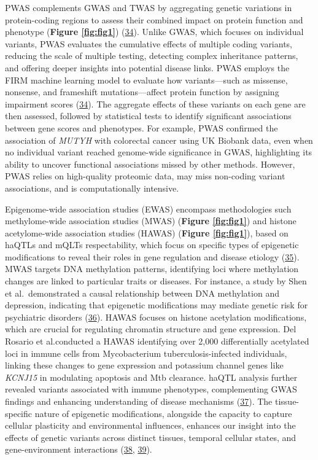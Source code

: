 PWAS complements GWAS and TWAS by aggregating genetic variations in protein-coding regions to assess their combined impact on protein function and phenotype (\textbf{Figure \ref{fig:fig1}}) (\protect\hyperlink{ref-1Dsj6bEd3}{34}).
Unlike GWAS, which focuses on individual variants, PWAS evaluates the cumulative effects of multiple coding variants, reducing the scale of multiple testing, detecting complex inheritance patterns, and offering deeper insights into potential disease links.
PWAS employs the FIRM machine learning model to evaluate how variants---such as missense, nonsense, and frameshift mutations---affect protein function by assigning impairment scores (\protect\hyperlink{ref-1Dsj6bEd3}{34}).
The aggregate effects of these variants on each gene are then assessed, followed by statistical tests to identify significant associations between gene scores and phenotypes.
For example, PWAS confirmed the association of \emph{MUTYH} with colorectal cancer using UK Biobank data, even when no individual variant reached genome-wide significance in GWAS, highlighting its ability to uncover functional associations missed by other methods.
However, PWAS relies on high-quality proteomic data, may miss non-coding variant associations, and is computationally intensive.

Epigenome-wide association studies (EWAS) encompass methodologies such methylome-wide association studies (MWAS) (\textbf{Figure \ref{fig:fig1}}) and histone acetylome-wide association studies (HAWAS) (\textbf{Figure \ref{fig:fig1}}), based on haQTLs and mQLTs respectability, which focus on specific types of epigenetic modifications to reveal their roles in gene regulation and disease etiology (\protect\hyperlink{ref-TPqvAJda}{35}).
MWAS targets DNA methylation patterns, identifying loci where methylation changes are linked to particular traits or diseases.
For instance, a study by Shen et al.~demonstrated a causal relationship between DNA methylation and depression, indicating that epigenetic modifications may mediate genetic risk for psychiatric disorders (\protect\hyperlink{ref-1DNxNkLsT}{36}).
HAWAS focuses on histone acetylation modifications, which are crucial for regulating chromatin structure and gene expression.
Del Rosario et al.conducted a HAWAS identifying over 2,000 differentially acetylated loci in immune cells from Mycobacterium tuberculosis-infected individuals, linking these changes to gene expression and potassium channel genes like \emph{KCNJ15} in modulating apoptosis and Mtb clearance.
haQTL analysis further revealed variants associated with immune phenotypes, complementing GWAS findings and enhancing understanding of disease mechanisms (\protect\hyperlink{ref-1BYHeZlgB}{37}).
The tissue-specific nature of epigenetic modifications, alongside the capacity to capture cellular plasticity and environmental influences, enhances our insight into the effects of genetic variants across distinct tissues, temporal cellular states, and gene-environment interactions (\protect\hyperlink{ref-FeaSnwhX}{38}, \protect\hyperlink{ref-KfWCLspO}{39}).

